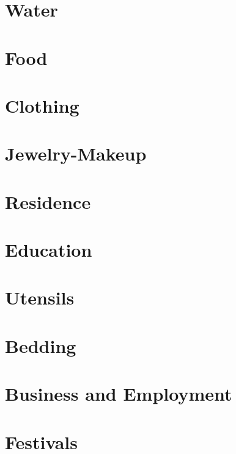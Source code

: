 \section{Water}
\section{Food}
\section{Clothing}
\section{Jewelry-Makeup}
\section{Residence}
\section{Education}
\section{Utensils}
\section{Bedding}
\section{Business and Employment}
\section{Festivals}
